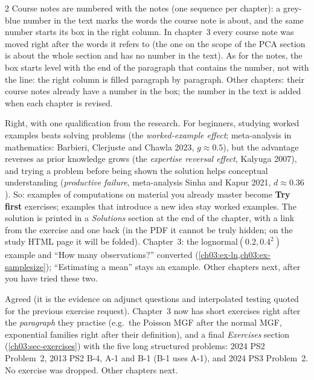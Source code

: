 \begin{paracol}{2}
{Course notes are numbered with the notes (one sequence per chapter): a grey-blue number in the text marks the
words the course note is about, and the same number starts its box in the right column. In chapter~3 every
course note was moved right after the words it refers to (the one on the scope of the PCA section is about
the whole section and has no number in the text). As for the notes, the box starts level with the end of the
paragraph that contains the number, not with the line: the right column is filled paragraph by paragraph.
Other chapters: their course notes already have a number in the box; the number in the text is added when
each chapter is revised.}

{Right, with one qualification from the research. For beginners, studying worked examples beats solving problems
(the \emph{worked-example effect}; meta-analysis in mathematics: Barbieri, Clerjuste and Chawla 2023, $g\approx0.5$),
but the advantage reverses as prior knowledge grows (the \emph{expertise reversal effect}, Kalyuga 2007), and trying
a problem before being shown the solution helps conceptual understanding (\emph{productive failure}, meta-analysis
Sinha and Kapur 2021, $d\approx0.36$). So: examples of computations on material you already master become
\textbf{Try first} exercises; examples that introduce a new idea stay worked examples. The solution is printed in a
\emph{Solutions} section at the end of the chapter, with a link from the exercise and one back (in the PDF it cannot
be truly hidden; on the study HTML page it will be folded). Chapter~3: the lognormal$(0.2,0.4^2)$ example and
``How many observations?'' converted (\cref{ch03:ex-ln,ch03:ex-samplesize}); ``Estimating a mean'' stays an example.
Other chapters next, after you have tried these two.}

{Agreed (it is the evidence on adjunct questions and interpolated testing quoted for the previous exercise request).
Chapter~3 now has short exercises right after the \emph{paragraph} they practise (e.g.\ the Poisson MGF after the
normal MGF, exponential families right after their definition), and a final \emph{Exercises} section
(\cref{ch03:sec-exercises}) with the five long structured problems: 2024 PS2 Problem~2, 2013 PS2 B-4, A-1 and B-1
(B-1 uses A-1), and 2024 PS3 Problem~2. No exercise was dropped. Other chapters next.}


\end{paracol}
